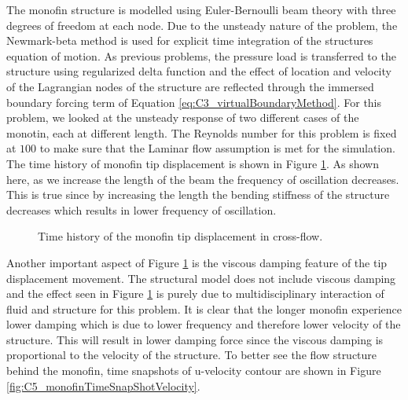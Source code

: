 The monofin structure is modelled using Euler-Bernoulli beam theory with three degrees of freedom at each node. Due to the unsteady nature of the problem, the Newmark-beta method is used for explicit time integration of the structures equation of motion. As previous problems, the pressure load is transferred to the structure using regularized delta function and the effect of location and velocity of the Lagrangian nodes of the structure are reflected through the immersed boundary forcing term of Equation \eqref{eq:C3_virtualBoundaryMethod}. For this problem, we looked at the unsteady response of two different cases of the monotin, each at different length. The Reynolds number for this problem is fixed at $100$ to make sure that the Laminar flow assumption is met for the simulation. The time history of monofin tip displacement is shown in Figure \ref{fig:C5_timeHistoryTipDisplacement}. As shown here, as we increase the length of the beam the frequency of oscillation decreases. This is true since by increasing the length the bending stiffness of the structure decreases which results in lower frequency of oscillation.
%
\begin{figure}[H]
    \centering
    \quad
    \caption{Time history of the monofin tip displacement in cross-flow.}
    \label{fig:C5_timeHistoryTipDisplacement}
\end{figure}
%
Another important aspect of Figure \ref{fig:C5_timeHistoryTipDisplacement} is the viscous damping feature of the tip displacement movement. The structural model does not include viscous damping and the effect seen in Figure \ref{fig:C5_timeHistoryTipDisplacement} is purely due to multidisciplinary interaction of fluid and structure for this problem. It is clear that the longer monofin experience lower damping which is due to lower frequency and therefore lower velocity of the structure. This will result in lower damping force since the viscous damping is proportional to the velocity of the structure. To better see the flow structure behind the monofin, time snapshots of u-velocity contour are shown in Figure \ref{fig:C5_monofinTimeSnapShotVelocity}.
